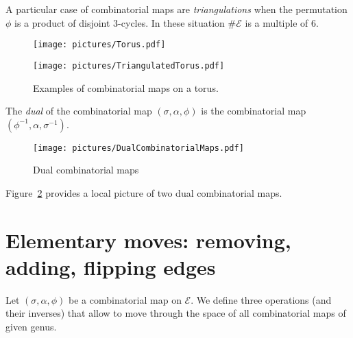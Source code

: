 \documentclass[a4paper,12pt]{article}
\def\cE{\mathcal{E}}
\begin{document}
A particular case of combinatorial maps are \emph{triangulations}
when the permutation $\phi$ is a product of disjoint 3-cycles.
In these situation $\# \cE$ is a multiple of $6$.

\begin{figure}[!ht]
\begin{minipage}{0.4\textwidth}
\begin{center}
\texttt{[image: pictures/Torus.pdf]}
\end{center}
\end{minipage}
\hspace{0.1\textwidth}
\begin{minipage}{0.4\textwidth}
\begin{center}
\texttt{[image: pictures/TriangulatedTorus.pdf]}
\end{center}
\end{minipage}
\caption{Examples of combinatorial maps on a torus.}
\label{fig:CombinatorialMapTori}
\end{figure}


The \emph{dual} of the combinatorial map $(\sigma, \alpha, \phi)$ is the combinatorial
map $(\phi^{-1}, \alpha, \sigma^{-1})$.
\begin{figure}[!ht]
\begin{center}
\texttt{[image: pictures/DualCombinatorialMaps.pdf]}
\end{center}
\caption{Dual combinatorial maps}
\label{fig:DualCombinatorialMaps}
\end{figure}

Figure~\ref{fig:DualCombinatorialMaps} provides a local picture of two dual
combinatorial maps.

\section{Elementary moves: removing, adding, flipping edges}
\label{sec:ElementaryMoves}
Let $(\sigma, \alpha, \phi)$ be a combinatorial map on $\cE$. We define three operations
(and their inverses) that allow to move through the space of all combinatorial maps of given genus.
\end{document}

